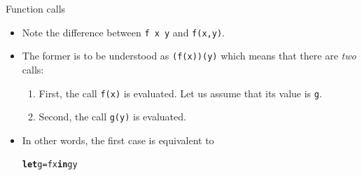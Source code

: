 \documentclass[compress,dvipdfmx]{beamer}
\begin{document}
%
\begin{frame}[fragile]{Function calls}

  \begin{itemize}

    \item Note the difference between \texttt{\small f x y}
      and \texttt{\small f(x,y)}.

    \item The former is to be understood as \texttt{\small (f(x))(y)}
      which means that there are \emph{two} calls:
      \begin{enumerate}

        \item First, the call \texttt{\small f(x)}
          is evaluated. Let us assume that its value is \texttt{\small g}.

        \item Second, the call \texttt{\small g(y)} is evaluated.

      \end{enumerate}

    \item In other words, the first case is equivalent to
      \vspace*{-3mm}
\begin{alltt}
\small
\textbf{let} g = f x \textbf{in} g y
\end{alltt}

  \end{itemize}
\end{frame}
\end{document}

